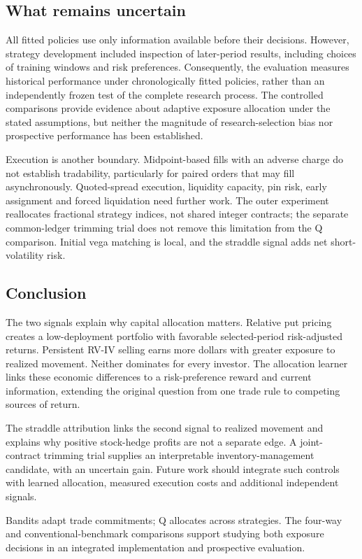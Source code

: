 \documentclass[11pt,letterpaper]{article}
\begin{document}
\subsection*{What remains uncertain}
All fitted policies use only information available before their decisions. However, strategy development included inspection of later-period results, including choices of training windows and risk preferences. Consequently, the evaluation measures historical performance under chronologically fitted policies, rather than an independently frozen test of the complete research process. The controlled comparisons provide evidence about adaptive exposure allocation under the stated assumptions, but neither the magnitude of research-selection bias nor prospective performance has been established.

Execution is another boundary. Midpoint-based fills with an adverse charge do not establish tradability, particularly for paired orders that may fill asynchronously. Quoted-spread execution, liquidity capacity, pin risk, early assignment and forced liquidation need further work. The outer experiment reallocates fractional strategy indices, not shared integer contracts; the separate common-ledger trimming trial does not remove this limitation from the Q comparison. Initial vega matching is local, and the straddle signal adds net short-volatility risk.

\subsection*{Conclusion}
The two signals explain why capital allocation matters. Relative put pricing creates a low-deployment portfolio with favorable selected-period risk-adjusted returns. Persistent RV-IV selling earns more dollars with greater exposure to realized movement. Neither dominates for every investor. The allocation learner links these economic differences to a risk-preference reward and current information, extending the original question from one trade rule to competing sources of return.

The straddle attribution links the second signal to realized movement and explains why positive stock-hedge profits are not a separate edge. A joint-contract trimming trial supplies an interpretable inventory-management candidate, with an uncertain gain. Future work should integrate such controls with learned allocation, measured execution costs and additional independent signals.

Bandits adapt trade commitments; Q allocates across strategies. The four-way and conventional-benchmark comparisons support studying both exposure decisions in an integrated implementation and prospective evaluation.
\end{document}
